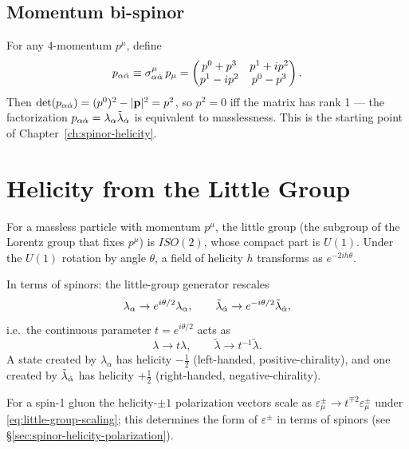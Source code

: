 \subsection{Momentum bi-spinor}

For any 4-momentum $p^\mu$, define
\begin{equation}
  p_{\alpha\dot{\alpha}} \equiv \sigma^\mu_{\alpha\dot{\alpha}}\,p_\mu
  = \begin{pmatrix} p^0+p^3 & p^1+ip^2 \\ p^1-ip^2 & p^0-p^3 \end{pmatrix}.
\end{equation}
Then $\det(p_{\alpha\dot{\alpha}}) = (p^0)^2 - |\mathbf{p}|^2 = p^2$, so $p^2=0$
iff the matrix has rank 1 --- the factorization $p_{\alpha\dot{\alpha}}=\lambda_\alpha\tilde\lambda_{\dot{\alpha}}$
is equivalent to masslessness.  This is the starting point of
Chapter~\ref{ch:spinor-helicity}.

\section{Helicity from the Little Group}
\label{sec:helicity-little-group}

For a massless particle with momentum $p^\mu$, the little group (the
subgroup of the Lorentz group that fixes $p^\mu$) is $ISO(2)$,
whose compact part is $U(1)$.  Under the $U(1)$ rotation by angle
$\theta$, a field of helicity $h$ transforms as $e^{-2ih\theta}$.

In terms of spinors: the little-group generator rescales
\begin{equation}
  \lambda_\alpha \to e^{i\theta/2}\lambda_\alpha, \qquad
  \tilde\lambda_{\dot{\alpha}} \to e^{-i\theta/2}\tilde\lambda_{\dot{\alpha}},
\end{equation}
i.e.\ the continuous parameter $t = e^{i\theta/2}$ acts as
\begin{equation}
  \lambda \to t\lambda, \qquad \tilde\lambda \to t^{-1}\tilde\lambda.
  \label{eq:little-group-scaling}
\end{equation}
A state created by $\lambda_\alpha$ has helicity $-\tfrac{1}{2}$ (left-handed,
positive-chirality), and one created by $\tilde\lambda_{\dot{\alpha}}$ has
helicity $+\tfrac{1}{2}$ (right-handed, negative-chirality).

For a spin-1 gluon the helicity-$\pm 1$ polarization vectors scale as
$\varepsilon^\pm_\mu \to t^{\mp 2}\varepsilon^\pm_\mu$ under
\eqref{eq:little-group-scaling}; this determines the form of $\varepsilon^\pm$
in terms of spinors (see \S\ref{sec:spinor-helicity-polarization}).

